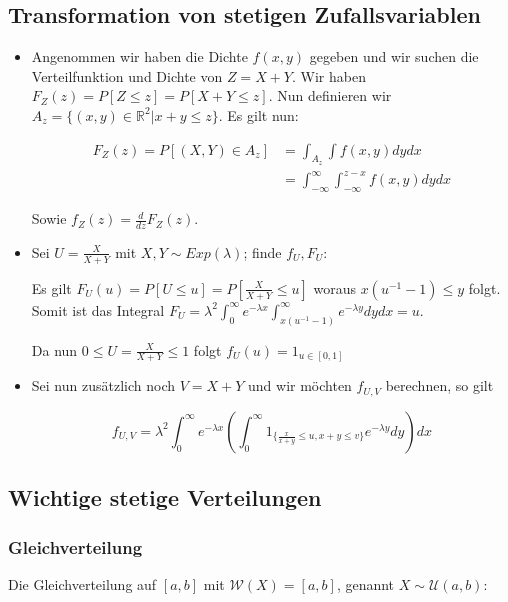 \documentclass[25pt]{sciposter}
\newcommand{\R}{\mathbb{R}}
\newcommand{\W}{\mathcal{W}}
\newcommand{\U}{\mathcal{U}}
\begin{document}
\begin{multicols}{3}
\subsection*{Transformation von stetigen Zufallsvariablen}
\begin{itemize}
	\item Angenommen wir haben die Dichte $f(x,y)$ gegeben und wir suchen die Verteilfunktion und Dichte von $Z = X + Y$. Wir haben $F_Z(z) = P[Z \leq z] = P[X+Y\leq z]$. Nun definieren wir $A_z = \{(x,y)\in\R^2|x+y\leq z\}$. Es gilt nun:
	
	\begin{align*}
	F_Z(z) = P[(X,Y)\in A_z] &= \int_{A_z} \int f(x,y) dy dx\\
	&= \int_{-\infty}^{\infty} \int_{-\infty}^{z-x} f(x,y) dy dx
	\end{align*}
	
	Sowie $f_Z(z) = \frac{d}{dz} F_Z(z)$.
	
	
\item Sei $U = \frac{X}{X+Y}$ mit $X,Y\sim Exp(\lambda)$; finde $f_U, F_U$:

Es gilt $F_U(u) = P[U \leq u] = P[\frac{X}{X+Y}\leq u]$ woraus $x(u^{-1} -1)\leq y$ folgt.
Somit ist das Integral $F_U = \lambda^2 \int_{0}^{\infty} e^{-\lambda x} \int_{x(u^{-1} -1)}^{\infty} e^{-\lambda y} dy dx = u$.

Da nun $0 \leq U = \frac{X}{X+Y} \leq 1$ folgt $f_U(u) = 1_{u\in[0,1]}$

\item Sei nun zusätzlich noch $V=X+Y$ und wir möchten $f_{U,V}$ berechnen, so gilt

$$f_{U,V} = \lambda^2 \int_{0}^{\infty} e^{-\lambda x} \left(\int_{0}^{\infty} 1_{\{\frac{x}{x+y}\leq u, x+y \leq v\}} e^{-\lambda y}dy \right) dx$$

\end{itemize}





\subsection*{Wichtige stetige Verteilungen}

\subsubsection*{Gleichverteilung}
Die Gleichverteilung auf $[a,b]$ mit $\W(X)=[a,b]$, genannt $X\sim\U(a,b)$:


\end{multicols}
\end{document}
